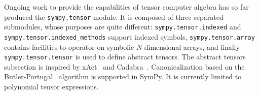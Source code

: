 Ongoing work to provide the capabilities of tensor computer algebra has so far
produced the \texttt{sympy.tensor} module.  It is composed of three separated
submodules, whose purposes are quite different: \texttt{sympy.tensor.indexed} and
\texttt{sympy.tensor.indexed\_methods} support indexed symbols,
\texttt{sympy.tensor.array} contains facilities to operator on symbolic $N$-dimensional
arrays, and finally \texttt{sympy.tensor.tensor} is used to define abstract tensors.
The abstract tensors subsection
is inspired by xAct~\cite{xAct} and Cadabra~\cite{Peeters2007cadabra}.
Canonicalization based on the Butler-Portugal~\cite{ManssurPortugal1999}
algorithm is supported in SymPy.  It is currently limited to polynomial tensor
expressions.
